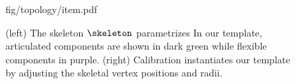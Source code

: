 \begin{figure}[t!]
\centering
\begin{overpic} 
[width=\linewidth]
{fig/topology/item.pdf}
\end{overpic}
\caption{
% 
% 
(left) The skeleton $\skeleton$ parametrizes  
% 
In our template, articulated components are shown in {\color{darkgreen} dark green} while flexible components in {\color{purple}purple}.
% 
(right) Calibration instantiates our template by adjusting the skeletal vertex positions and radii. 
% 
% 
}
\label{fig:topology}
\end{figure}